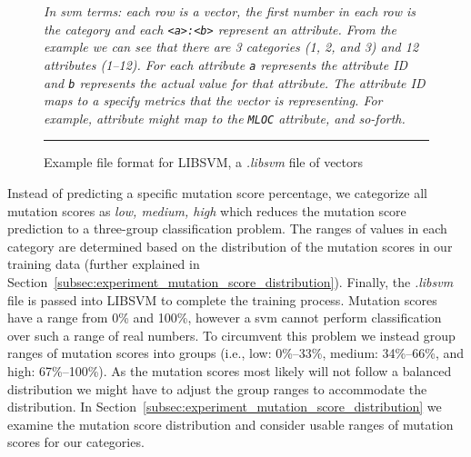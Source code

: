 \begin{figure}[t]
  \centering
  \begin{minipage}{9.5cm}
    
  \end{minipage}
  \caption{Example file format for LIBSVM, a \emph{.libsvm} file of vectors}
  \vspace{1mm}
  \footnotesize{\emph{In \gls{svm} terms: each row is a vector, the first number in each row is the category and each \texttt{<a>:<b>} represent an attribute. From the example we can see that there are 3 categories (1, 2, and 3) and 12 attributes (1--12). For each attribute \texttt{a} represents the attribute ID and \texttt{b} represents the actual value for that attribute. The attribute ID maps to a specify metrics that the vector is representing. For example, attribute  might map to the \texttt{MLOC} attribute, and so-forth.}}
  \vspace{2mm}
  \hrule
  \label{fig:libsvm_file}
\end{figure}

Instead of predicting a specific mutation score percentage, we categorize all mutation scores as \textit{low, medium, high} which reduces the mutation score prediction to a three-group classification problem. The ranges of values in each category are determined based on the distribution of the mutation scores in our training data (further explained in Section~\ref{subsec:experiment_mutation_score_distribution}). Finally, the \emph{.libsvm} file is passed into LIBSVM to complete the training process. Mutation scores have a range from 0\% and 100\%, however a \gls{svm} cannot perform classification over such a range of real numbers. To circumvent this problem we instead group ranges of mutation scores into groups (i.e., low: 0\%--33\%, medium: 34\%--66\%, and high: 67\%--100\%). As the mutation scores most likely will not follow a balanced distribution we might have to adjust the group ranges to accommodate the distribution. In Section~\ref{subsec:experiment_mutation_score_distribution} we examine the mutation score distribution and consider usable ranges of mutation scores for our categories.


